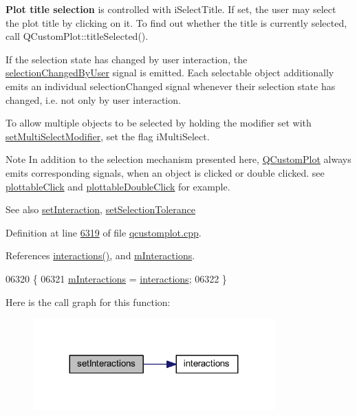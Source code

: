 {\bfseries Plot title selection} is controlled with i\+Select\+Title. If set, the user may select the plot title by clicking on it. To find out whether the title is currently selected, call Q\+Custom\+Plot\+::title\+Selected().

If the selection state has changed by user interaction, the \hyperlink{a00116_a500c64a109bc773c973ad274f2fa4190}{selection\+Changed\+By\+User} signal is emitted. Each selectable object additionally emits an individual selection\+Changed signal whenever their selection state has changed, i.\+e. not only by user interaction.

To allow multiple objects to be selected by holding the modifier set with \hyperlink{a00116_a8fc96e3b5138a06759a2a90c166df516}{set\+Multi\+Select\+Modifier}, set the flag i\+Multi\+Select.

\begin{DoxyNote}{Note}
In addition to the selection mechanism presented here, \hyperlink{a00030_d8/d00/a00186}{Q\+Custom\+Plot} always emits corresponding signals, when an object is clicked or double clicked. see \hyperlink{a00116_a57e5efa8a854620e9bf62d31fc139f53}{plottable\+Click} and \hyperlink{a00116_af2e6f1cea923dae437681d01ce7d0c31}{plottable\+Double\+Click} for example.
\end{DoxyNote}
\begin{DoxySeeAlso}{See also}
\hyperlink{a00116_af9af5370ddc6e57f3e15809c1576cc38}{set\+Interaction}, \hyperlink{a00116_a4dc31241d7b09680950e19e5f971ed93}{set\+Selection\+Tolerance} 
\end{DoxySeeAlso}


Definition at line \hyperlink{a00115_source_l06319}{6319} of file \hyperlink{a00115_source}{qcustomplot.\+cpp}.



References \hyperlink{a00116_source_l01975}{interactions()}, and \hyperlink{a00116_source_l02127}{m\+Interactions}.


\begin{DoxyCode}
06320 \{
06321   \hyperlink{a00116_af8d040767753acc548b2368dd4150ae6}{mInteractions} = \hyperlink{a00116_aa9966a7b4022af4909a34d9a31f6b229}{interactions};
06322 \}
\end{DoxyCode}


Here is the call graph for this function\+:
\nopagebreak
\begin{figure}[H]
\begin{center}
\leavevmode
\includegraphics[width=263pt]{d4/d3e/a00116_add9cc886ff5257f64fb4117cf6c135fe_cgraph}
\end{center}
\end{figure}



